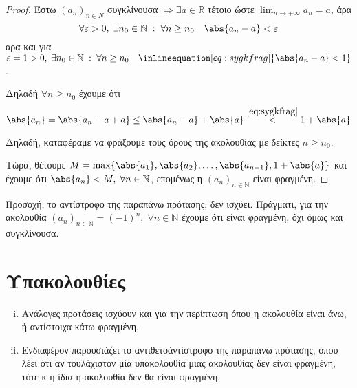 \documentclass[main.tex]{subfiles}
\begin{document}


\begin{proof}
  Έστω $ (a_{n})_{n \in \mathbb{Ν}} $ συγκλίνουσα $ \Rightarrow 
  \exists a \in \mathbb{R} $ τέτοιο ώστε $ \lim_{n \to +\infty} a_{n}
  =a $, άρα 
  \[
    \forall \varepsilon > 0, \; \exists n_{0} \in \mathbb{N} \; 
    : \; \forall n \geq n_{0}\quad \abs{a_{n}-a} < \varepsilon  
  \] 
  αρα και για $ \varepsilon =1>0, \; \exists n_{0} \in \mathbb{N} \; 
  : \; \forall n \geq n_{0} \quad 
  \inlineequation[eq:sygkfrag]{\abs{a_{n}-a} < 1} $. 

  Δηλαδή $ \forall n \geq n_{0} $ έχουμε ότι 
  \[
    \abs{a_{n}} = \abs{a_{n}-a + a} \leq \abs{a_{n} - a} + \abs{a} 
    \overset{\eqref{eq:sygkfrag}}{<} 1 + \abs{a}  
  \] 

  Δηλαδή, καταφέραμε να φράξουμε τους όρους της ακολουθίας με δείκτες 
  $n \geq n_{0} $.

  Τώρα, θέτουμε $ M = \max \{ \abs{a_{1}} , \abs{a_{2}} , \ldots, 
  \abs{a_{n-1}} , 1 + \abs{a}\} $ και έχουμε ότι $ \abs{a_{n}} 
  < M, \; \forall n \in \mathbb{N} $, επομένως η 
  $ (a_{n})_{n \in \mathbb{N}} $ είναι φραγμένη.
\end{proof}

\begin{rem}
  Προσοχή, το αντίστροφο της παραπάνω πρότασης, δεν ισχύει. Πράγματι, 
  για την  ακολουθία $ (a_{n})_{n \in \mathbb{N}} = (-1)^{n}, \; 
  \forall n \in \mathbb{N} $ έχουμε ότι είναι φραγμένη, όχι όμως και 
  συγκλίνουσα.
\end{rem}

\section{Υπακολουθίες}




\begin{rem}
\item {}
  \begin{enumerate}[i)]
    \item Ανάλογες προτάσεις ισχύουν και για την περίπτωση όπου η 
      ακολουθία είναι άνω, ή αντίστοιχα κάτω φραγμένη.
    \item 
      Ενδιαφέρον παρουσιάζει το αντιθετοάντίστροφο της παραπάνω 
      πρότασης, όπου λέει ότι αν τουλάχιστον μία υπακολουθία μιας 
      ακολουθίας δεν είναι φραγμένη, τότε κ η ίδια η ακολουθία 
      δεν θα είναι φραγμένη.
  \end{enumerate}
\end{rem}
\end{document}
